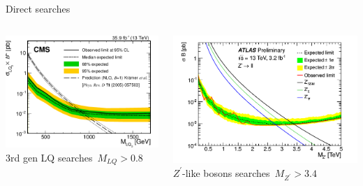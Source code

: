 \documentclass[9pt,usenames,dvipsnames]{beamer}
\begin{document}
\begin{frame}{Direct searches }	
	\begin{columns}[c]
		\begin{center}	
			\includegraphics[width=\textwidth]{./assets/lq_cms} 		\\ 3rd gen LQ searches~$M_{LQ}>0.8$\TeV
		\end{center}

		\begin{center}
			\includegraphics[width= \textwidth]{./assets/zprime_atlas} 	\\ $Z^\prime$-like bosons searches~$M_{Z^\prime}>3.4$\TeV	
		\end{center}
	\end{columns}
\end{frame}
\end{document}

